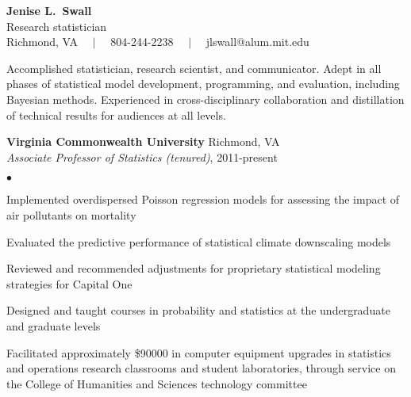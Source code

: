 \documentclass[11pt]{article}
\def\newsectn{\vspace*{0.6cm}}
\def\newempl{\vspace*{0.4cm}}
\begin{document}
\thispagestyle{empty}


\begin{center}
{\Large{\textbf{Jenise L.~Swall}}}\\
{\Large{Research statistician}}\\ \vspace*{0.05in}
Richmond, VA $\quad | \quad$ 804-244-2238 $\quad | \quad$ jlswall@alum.mit.edu\\
\hrulefill
\end{center}






Accomplished statistician, research scientist, and communicator.  Adept in all
phases of statistical model development, programming, and evaluation, including
Bayesian methods. Experienced in cross-disciplinary collaboration and
distillation of technical results for audiences at all levels.



\newsectn
{} 


\textbf{Virginia Commonwealth University}  \hfill Richmond, VA\\
\textit{Associate Professor of Statistics (tenured)}, 2011-present

\begin{list}{$\bullet$}{
\setlength{\topsep}{0cm}
\setlength{\partopsep}{0cm}
\setlength{\parsep}{0cm}
\setlength{\itemsep}{0cm}
\setlength{\labelsep}{1ex}
\setlength{\labelwidth}{1em}
\setlength{\leftmargin}{1em}
}
\item Implemented overdispersed Poisson regression models for assessing the impact of air pollutants on mortality
\item Evaluated the predictive performance of statistical climate
  downscaling models
\item Reviewed and recommended adjustments for proprietary statistical
  modeling strategies for Capital One
\item Designed and taught courses in probability and statistics at the
undergraduate and graduate levels
\item Facilitated approximately \$90000 in computer equipment upgrades in statistics and operations research classrooms and student laboratories, through service on the College of Humanities and Sciences technology committee 
\end{list}
\end{document}
